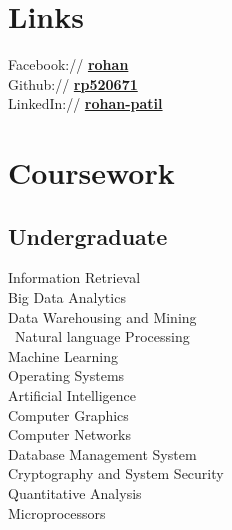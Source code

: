 \documentclass[]{rohan-resume-openfont}
\begin{document}
\begin{minipage}[t]{0.33\textwidth}
\sectionsep


\section{Links} 
Facebook:// \href{https://www.facebook.com/profile.php?id=100015914148004}{\bf rohan} \\
Github:// \href{https://github.com/rp520671}{\bf rp520671} \\
LinkedIn://  \href{www.linkedin.com/in/rohan-patil-8b860a201}{\bf rohan-patil} \\

\sectionsep

\section{Coursework}

\subsection{Undergraduate}
Information Retrieval \\
Big Data Analytics \\
Data Warehousing and Mining \\\
Natural language Processing \\
Machine Learning\\
Operating Systems \\
Artificial Intelligence \\
Computer Graphics \\
Computer Networks\\
Database Management System\\
Cryptography and System Security\\
Quantitative Analysis\\
Microprocessors \\


\sectionsep
%
%

\end{minipage} 
\hfill
\end{document}
